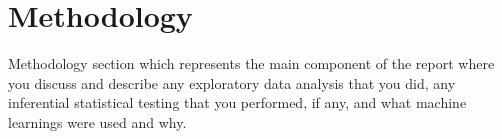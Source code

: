 \chapter{Methodology}
Methodology section which represents the main component of the report where you discuss and describe any exploratory data analysis that you did, any inferential statistical testing that you performed, if any, and what machine learnings were used and why.